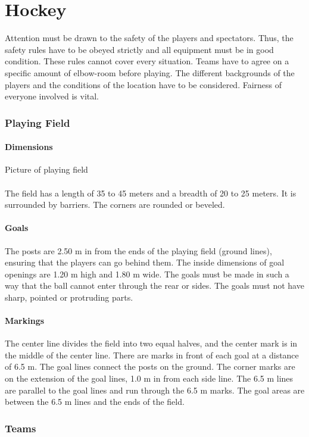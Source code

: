 \part{Hockey}
Attention must be drawn to the safety of the players and spectators. Thus, the safety rules have to be obeyed strictly and all
equipment must be in good condition. These rules cannot cover every situation. Teams have to agree on a specific amount
of elbow-room before playing. The different backgrounds of the players and the conditions of the location have to be
considered. Fairness of everyone involved is vital.
\section{Playing Field}
\subsection{Dimensions}
Picture of playing field
\subsection{}
The field has a length of 35 to 45 meters and a breadth of 20 to 25 meters. It is surrounded by barriers. The corners are
rounded or beveled.
\subsection{Goals}
The posts are 2.50 m in from the ends of the playing field (ground lines), ensuring that the players can go behind them.
The inside dimensions of goal openings are 1.20 m high and 1.80 m wide. The goals must be made in such a way that
the ball cannot enter through the rear or sides. The goals must not have sharp, pointed or protruding parts.
\subsection{Markings}
The center line divides the field into two equal halves, and the center mark is in the middle of the center line. There are
marks in front of each goal at a distance of 6.5 m. The goal lines connect the posts on the ground. The corner marks are
on the extension of the goal lines, 1.0 m in from each side line. The 6.5 m lines are parallel to the goal lines and run
through the 6.5 m marks. The goal areas are between the 6.5 m lines and the ends of the field.
\section{Teams}

